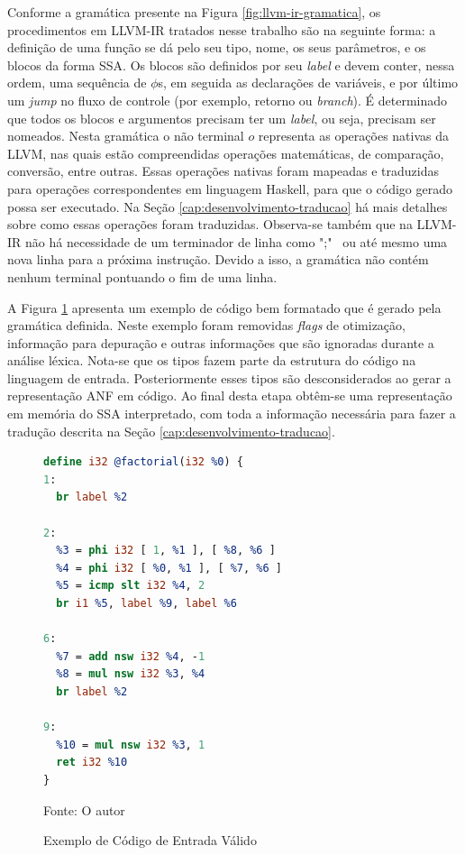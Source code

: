 Conforme a gramática presente na Figura \ref{fig:llvm-ir-gramatica}, os procedimentos em LLVM-IR tratados nesse trabalho são na seguinte forma: a definição de uma função se dá pelo seu tipo, nome, os seus parâmetros, e os blocos da forma SSA. Os blocos são definidos por seu \emph{label} e devem conter, nessa ordem, uma sequência de $\phi$s, em seguida as declarações de variáveis, e por último um \emph{jump} no fluxo de controle (por exemplo, retorno ou \emph{branch}). É determinado que todos os blocos e argumentos precisam ter um \emph{label}, ou seja, precisam ser nomeados. Nesta gramática o não terminal $o$ representa as operações nativas da LLVM, nas quais estão compreendidas operações matemáticas, de comparação, conversão, entre outras. Essas operações nativas foram mapeadas e traduzidas para operações correspondentes em linguagem Haskell, para que o código gerado possa ser executado. Na Seção \ref{cap:desenvolvimento-traducao} há mais detalhes sobre como essas operações foram traduzidas. Observa-se também que na LLVM-IR não há necessidade de um terminador de linha como ";" \ ou até mesmo uma nova linha para a próxima instrução. Devido a isso, a gramática não contém nenhum terminal pontuando o fim de uma linha.

A Figura \ref{fig:exemplo-entrada} apresenta um exemplo de código bem formatado que é gerado pela gramática definida. Neste exemplo foram removidas \emph{flags} de otimização, informação para depuração e outras informações que são ignoradas durante a análise léxica. Nota-se que os tipos fazem parte da estrutura do código na linguagem de entrada. Posteriormente esses tipos são desconsiderados ao gerar a representação ANF em código. Ao final desta etapa obtêm-se uma representação em memória do SSA interpretado, com toda a informação necessária para fazer a tradução descrita na Seção \ref{cap:desenvolvimento-traducao}.

\begin{figure}
\centering
\lstset{xleftmargin=.25\textwidth}
\begin{lstlisting}[language=llvm,style=nasm]
define i32 @factorial(i32 %0) {
1:
  br label %2

2:
  %3 = phi i32 [ 1, %1 ], [ %8, %6 ]
  %4 = phi i32 [ %0, %1 ], [ %7, %6 ]
  %5 = icmp slt i32 %4, 2
  br i1 %5, label %9, label %6

6:
  %7 = add nsw i32 %4, -1
  %8 = mul nsw i32 %3, %4
  br label %2

9:
  %10 = mul nsw i32 %3, 1
  ret i32 %10
}
\end{lstlisting}
\caption{Exemplo de Código de Entrada Válido}
\label{fig:exemplo-entrada}
\small{Fonte: O autor}
\end{figure}

